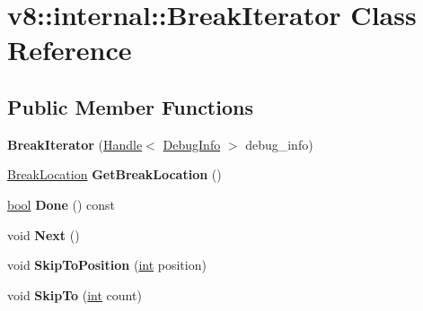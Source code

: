 \hypertarget{classv8_1_1internal_1_1BreakIterator}{}\section{v8\+:\+:internal\+:\+:Break\+Iterator Class Reference}
\label{classv8_1_1internal_1_1BreakIterator}
\subsection*{Public Member Functions}
\begin{DoxyCompactItemize}
\item 
\mbox{\label{classv8_1_1internal_1_1BreakIterator_a1bebe9500f13c9bdd06b45977bbd2889}} 
{\bfseries Break\+Iterator} (\mbox{\hyperlink{classv8_1_1internal_1_1Handle}{Handle}}$<$ \mbox{\hyperlink{classv8_1_1internal_1_1DebugInfo}{Debug\+Info}} $>$ debug\+\_\+info)
\item 
\mbox{\label{classv8_1_1internal_1_1BreakIterator_a1802fa093bf35182f8c0785bdc731c2f}} 
\mbox{\hyperlink{classv8_1_1internal_1_1BreakLocation}{Break\+Location}} {\bfseries Get\+Break\+Location} ()
\item 
\mbox{\label{classv8_1_1internal_1_1BreakIterator_af7d4f3ccf079825f31140bda41879df4}} 
\mbox{\hyperlink{classbool}{bool}} {\bfseries Done} () const
\item 
\mbox{\label{classv8_1_1internal_1_1BreakIterator_a457356d050c43d978706b3373d537bbe}} 
void {\bfseries Next} ()
\item 
\mbox{\label{classv8_1_1internal_1_1BreakIterator_a8871e8a3a7b74ed82499cc6c0519e0e3}} 
void {\bfseries Skip\+To\+Position} (\mbox{\hyperlink{classint}{int}} position)
\item 
\mbox{\label{classv8_1_1internal_1_1BreakIterator_a6ab9d01cb29f2e155f80304f3f4639a1}} 
void {\bfseries Skip\+To} (\mbox{\hyperlink{classint}{int}} count)
\item 
\mbox{\label{classv8_1_1internal_1_1BreakIterator_a16789d710bc832ef503d09c786f05fbf}} 

\end{DoxyCompactItemize}
